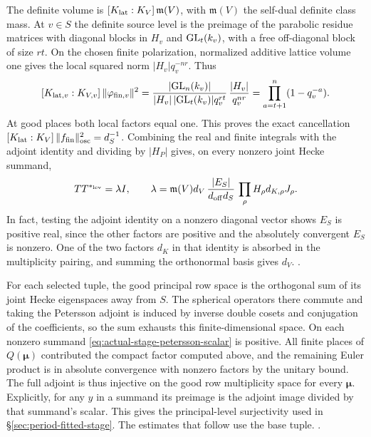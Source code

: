 The definite volume is
\([K_{\rm lat}:K_V]\,\mathfrak m(V)\), with
\(\mathfrak m(V)\) the self-dual definite class mass.
At \(v\in S\) the definite source level is the
preimage of the parabolic residue matrices with diagonal
blocks in \(H_v\) and \({\rm GL}_t(k_v)\), with a free
off-diagonal block of size \(rt\). On the chosen finite
polarization, normalized additive lattice volume one gives
the local squared norm \(|H_v|q_v^{-nr}\). Thus
\[
 [K_{{\rm lat},v}:K_{V,v}]\,\|\varphi_{{\rm fin},v}\|^2
  =\frac{|{\rm GL}_n(k_v)|}{|H_v|\,|{\rm GL}_t(k_v)|q_v^{rt}}\,
      \frac{|H_v|}{q_v^{nr}}
  =\prod_{a=t+1}^{n}(1-q_v^{-a}).
\]
At good places both local factors equal one. This proves the
exact cancellation
\([K_{\rm lat}:K_V]\,\|f_{\rm fin}\|^2_{\rm osc}=d_S^{-1}\).
Combining the real and finite integrals with the adjoint
identity and dividing by \(|H_P|\) gives, on every nonzero
joint Hecke summand,
\begin{equation}
\label{eq:actual-stage-petersson-scalar}
 TT^{*_{\rm lev}}=\lambda I,\qquad
 \lambda=\mathfrak m(V)d_V\,\frac{|E_S|}{d_{\rm off}d_S}\,
             \prod_\rho H_\rho d_{K,\rho} J_\rho .
\end{equation}
In fact, testing the adjoint identity on a nonzero diagonal
vector shows \(E_S\) is positive real, since the other factors
are positive and the absolutely convergent \(E_S\) is
nonzero. One of the two factors \(d_K\) in that identity
is absorbed in the multiplicity pairing, and summing the
orthonormal basis gives \(d_V\).
.

For each selected tuple, the good principal row space is the
orthogonal sum of its joint Hecke eigenspaces away from
\(S\). The spherical operators there commute and taking
the Petersson adjoint is induced by inverse double cosets
and conjugation of the coefficients, so the sum exhausts
this finite-dimensional space. On each nonzero summand
\eqref{eq:actual-stage-petersson-scalar} is positive. All
finite places of \(Q(\boldsymbol\mu)\) contributed the
compact factor computed above, and the remaining Euler
product is in absolute convergence with nonzero factors by
the unitary bound. The full adjoint is thus injective on
the good row multiplicity space for every \(\boldsymbol\mu\).
Explicitly, for any \(y\) in a summand its preimage is the
adjoint image divided by that summand's scalar. This gives
the principal-level surjectivity used in
\S\ref{sec:period-fitted-stage}. The estimates that follow
use the base tuple.
.

